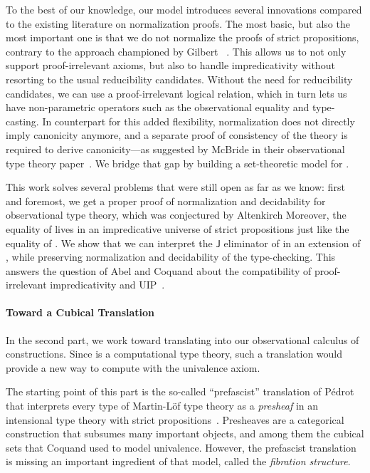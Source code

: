 To the best of our knowledge, our model introduces several innovations compared 
to the existing literature on normalization proofs.
% 
The most basic, but also the most important one is that we do not normalize the 
proofs of strict propositions, contrary to the approach championed by 
Gilbert \etal~. 
% 
This allows us to not only support proof-irrelevant axioms, but also to handle 
impredicativity without resorting to the usual reducibility candidates.
% 
Without the need for reducibility candidates, we can use a proof-irrelevant
logical relation, which in turn lets us have non-parametric operators such
as the observational equality and type-casting.
% 
In counterpart for this added flexibility, normalization does not directly
imply canonicity anymore, and a separate proof of consistency of the
theory is required to derive canonicity---as suggested by McBride \etal in
their observational type theory paper~.
% 
We bridge that gap by building a set-theoretic model for \SetoidCC.

This work solves several problems that were still open as far as we know:
% 
% 
first and foremost, we get a proper proof of normalization and decidability for 
observational type theory, which was conjectured by Altenkirch \etal
% 
Moreover, the equality of \SetoidCC lives in an impredicative universe 
of strict propositions just like the equality of \Lean. 
% 
We show that we can interpret the \( \mathsf{J} \) eliminator of \Lean
in an extension of \SetoidCC, while preserving normalization and decidability
of the type-checking.
% 
This answers the question of Abel and Coquand about the compatibility of 
proof-irrelevant impredicativity and UIP~.

\paragraph{Toward a Cubical Translation}
% 
In the second part, we work toward translating \HoTT into our observational
calculus of constructions.
% 
Since \SetoidCC is a computational type theory, such a translation would 
provide a new way to compute with the univalence axiom.

The starting point of this part is the so-called ``prefascist'' translation of
Pédrot that interprets every type of Martin-Löf type theory as a 
\emph{presheaf} in an intensional type theory with strict 
propositions~.
% 
Presheaves are a categorical construction that subsumes many important
objects, and among them the cubical sets that Coquand \etal used to model
univalence.
% 
However, the prefascist translation is missing an important ingredient of
that model, called the \emph{fibration structure}.

